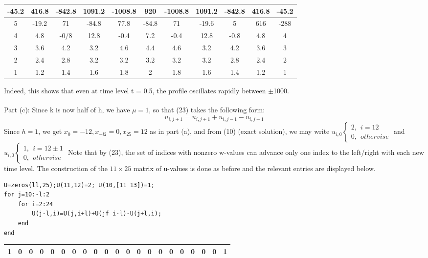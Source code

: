 \documentclass[../main.tex]{subfiles}
\begin{document}
{{\begin{table}[!ht]
    \centering
    \begin{tabular}{|c|c|c|c|c|c|c|c|c|c|c|}
    \hline
        -45.2 & 416.8 & -842.8 & 1091.2 & -1008.8 & 920 & -1008.8 & 1091.2 & -842.8 & 416.8 & -45.2 \\ \hline
        5 & -19.2 & 71 & -84.8 & 77.8 & -84.8 & 71 & -19.6 & 5 & 616 &-288\\ \hline
        4 & 4.8 & -0/8 & 12.8 & -0.4 & 7.2 & -0.4 & 12.8 & -0.8 & 4.8 & 4  \\ \hline
        3 & 3.6 & 4.2 & 3.2 & 4.6 & 4.4 & 4.6 & 3.2 & 4.2 & 3.6 & 3  \\ \hline
        2 & 2.4 & 2.8 & 3.2 & 3.2 & 3.2 & 3.2 & 3.2 & 2.8 & 2.4 & 2 \\ \hline
        1 & 1.2 & 1.4 & 1.6 & 1.8 & 2 & 1.8 & 1.6 & 1.4 & 1.2 & 1 \\ \hline
    \end{tabular}
\end{table}
Indeed, this shows that even at time level t = 0.5, the profile oscillates rapidly 
between $\pm$1000.
\\
\\
Part (c): Since k is now half of h, we have $\mu = 1$, so that (23) takes the following form:  
$$u_{i,j+1}=u_{i,j+1}+u_{i,j-1}-u_{i,j-1}$$
Since $h = 1$, we get $x_0 = -12, x_{-l2} = 0, x_{25} = 12$ as in part (a), and from (10) (exact solution), we may write
$u_{i,0}
	\begin{cases}
		2, ~~i=12 \\
		0, ~~othervise
	\end{cases}$ and
$u_{i,0}
	\begin{cases}
		1, ~~i=12\pm 1 \\
		0, ~~othervise
	\end{cases}$
Note that  by (23), the set of indices with nonzero w-values can advance only one index to the left/right with each new time level. The construction of the $11 \times 25$ matrix of u-values is done as before and the relevant entries are displayed below. 
\begin{lstlisting}[numbers=none,frame=none]
U=zeros(ll,25);U(11,12)=2; U(10,[11 13])=1; 
for j=10:-l:2 
	for i=2:24 
		U(j-l,i)=U(j,i+l)+U(jf i-l)-U(j+l,i); 
	end 
end 
\end{lstlisting}
\begin{table}[!ht]
    \centering
    \begin{tabular}{|c|c|c|c|c|c|c|c|c|c|c|c|c|c|c|c|c|c|c|c|c|}
    \hline
       1&0&0&0&0&0&0&0&0&0&0&0&0&0&0&0&0&0&0&0&1\\ \hline

\end{tabular}
\end{table}}}
\end{document}
